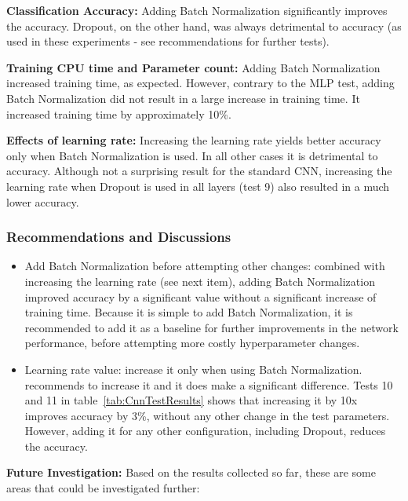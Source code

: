 \documentclass[../dropout-vs-batch-normalization.tex]{subfiles}
\begin{document}
\smallskip
\noindent\textbf{Classification Accuracy:} Adding Batch Normalization significantly improves the accuracy. Dropout, on the other hand, was always detrimental to accuracy (as used in these experiments - see recommendations for further tests).

\smallskip
\noindent\textbf{Training CPU time and Parameter count:} Adding Batch Normalization increased training time, as expected. However, contrary to the MLP test, adding Batch Normalization did not result in a large increase in training time. It increased training time by approximately 10\%.

\smallskip
\noindent\textbf{Effects of learning rate:} Increasing the learning rate yields better accuracy only when Batch Normalization is used. In all other cases it is detrimental to accuracy. Although not a surprising result for the standard CNN, increasing the learning rate when Dropout is used in all layers (test 9) also resulted in a much lower accuracy. 

\medskip
\subsubsection{Recommendations and Discussions}

\begin{itemize}
\item Add Batch Normalization before attempting other changes: combined with increasing the learning rate (see next item), adding Batch Normalization improved accuracy by a significant value without a significant increase of training time. Because it is simple to add Batch Normalization, it is recommended to add it as a baseline for further improvements in the network performance, before attempting more costly hyperparameter changes.
\item Learning rate value: increase it only when using Batch Normalization. \cite{Ioffe2015} recommends to increase it and it does make a significant difference. Tests 10 and 11 in table~\ref{tab:CnnTestResults} shows that increasing it by 10x improves accuracy by 3\%, without any other change in the test parameters. However, adding it for any other configuration, including Dropout, reduces the accuracy.
\end{itemize}


\medskip
\noindent\textbf{Future Investigation:} Based on the results collected so far, these are some areas that could be investigated further:
\end{document}
